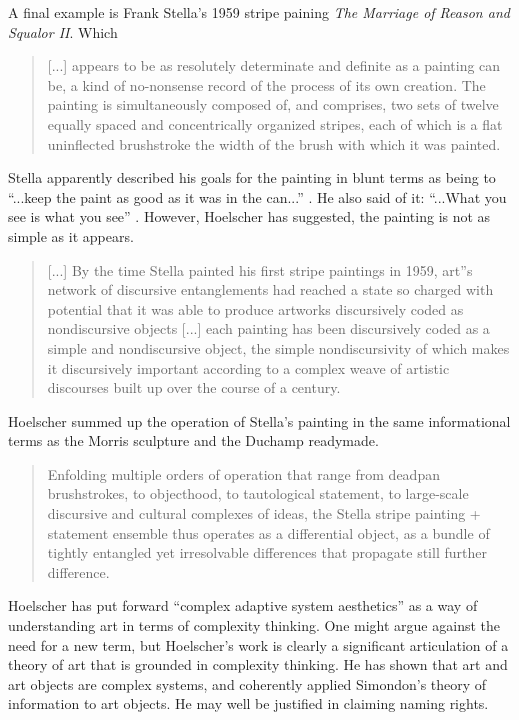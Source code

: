                A final example is Frank Stella's 1959 stripe paining \emph{The Marriage of Reason and Squalor II}. Which

                \begin{quote}
                    [...] appears to be as resolutely determinate and definite as a painting can be, a kind of no-nonsense record of the process of its own creation. The painting is simultaneously composed of, and comprises, two sets of twelve equally spaced and concentrically organized stripes, each of which is a flat uninflected brushstroke the width of the brush with which it was painted.
                \end{quote}

                Stella apparently described his goals for the painting in blunt terms as being to “...keep the paint as good as it was in the can...” \citep[p.38]{HoelscherArtAsInfrmtn2021}. He also said of it: “...What you see is what you see” \citep[p.39]{HoelscherArtAsInfrmtn2021}. However, Hoelscher has suggested, the painting is not as simple as it appears.

                \begin{quote}
                    [...] By the time Stella painted his first stripe paintings in 1959, art”s network of discursive entanglements had reached a state so charged with potential that it was able to produce artworks discursively coded as nondiscursive objects [...] each painting has been discursively coded as a simple and nondiscursive object, the simple nondiscursivity of which makes it discursively important according to a complex weave of artistic discourses built up over the course of a century.
                \end{quote}

                Hoelscher summed up the operation of Stella's painting in the same informational terms as the Morris sculpture and the Duchamp readymade.

                \begin{quote}
                    Enfolding multiple orders of operation that range from deadpan brushstrokes, to objecthood, to tautological statement, to large-scale discursive and cultural complexes of ideas, the Stella stripe painting + statement ensemble thus operates as a differential object, as a bundle of tightly entangled yet irresolvable differences that propagate still further difference.
                \end{quote}

                Hoelscher has put forward “complex adaptive system aesthetics” as a way of understanding art in terms of complexity thinking. One might argue against the need for a new term, but Hoelscher's work is clearly a significant articulation of a theory of art that is grounded in complexity thinking. He has shown that art and art objects are complex systems, and coherently applied Simondon's theory of information to art objects. He may well be justified in claiming naming rights.

